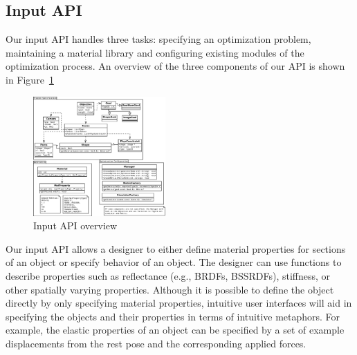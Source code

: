 \documentclass[annual]{acmsiggraph}
\begin{document}
\subsection{Input API}
Our input API handles three tasks: specifying an optimization problem,
maintaining a material library and configuring existing modules of
the optimization process.
An overview of the three components of our API is shown in Figure~\ref{fig:inputAPI}

\begin{figure}
\includegraphics[width=0.45\textwidth]{figure/inputAPI.pdf}
\caption{Input API overview}
\label{fig:inputAPI}
\end{figure}

Our input API allows a designer to either
define material properties for sections of an object
or specify behavior of an object.
The designer
can use functions to describe properties such as reflectance (e.g., BRDFs, BSSRDFs), 
stiffness, or other spatially varying properties. 
Although it is possible to define the object directly by only specifying material
properties, intuitive user
interfaces will aid in specifying the objects and their properties
in terms of intuitive metaphors.
For example, the elastic properties of an object can be specified by a set of
example displacements from the rest pose and the corresponding applied forces.
\end{document}
